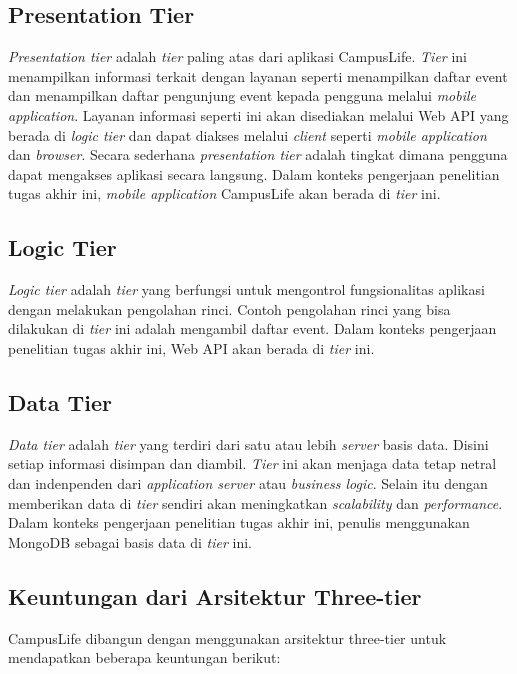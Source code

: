 \documentclass[a4paper, 12pt]{report}
\begin{document}
\subsection{Presentation Tier}
\onehalfspacing \textit{Presentation tier} adalah \textit{tier} paling atas dari aplikasi CampusLife. \textit{Tier} ini menampilkan informasi terkait dengan layanan seperti menampilkan daftar event dan menampilkan daftar pengunjung event kepada pengguna melalui \textit{mobile application}. Layanan informasi seperti ini akan disediakan melalui Web API yang berada di \textit{logic tier} dan dapat diakses melalui \textit{client} seperti \textit{mobile application} dan \textit{browser}. Secara sederhana \textit{presentation tier} adalah tingkat dimana pengguna dapat mengakses aplikasi secara langsung. Dalam konteks pengerjaan penelitian tugas akhir ini, \textit{mobile application} CampusLife akan berada di \textit{tier} ini\cite{multitier-architecture-wikipedia}.

\subsection{Logic Tier}
\onehalfspacing \textit{Logic tier} adalah \textit{tier} yang berfungsi untuk mengontrol fungsionalitas aplikasi dengan melakukan pengolahan rinci. Contoh pengolahan rinci yang bisa dilakukan di \textit{tier} ini adalah mengambil daftar event. Dalam konteks pengerjaan penelitian tugas akhir ini, Web API akan berada di \textit{tier} ini\cite{multitier-architecture-wikipedia}.

\subsection{Data Tier}
\onehalfspacing \textit{Data tier} adalah \textit{tier} yang terdiri dari satu atau lebih \textit{server} basis data. Disini setiap informasi disimpan dan diambil. \textit{Tier} ini akan menjaga data tetap netral dan indenpenden dari \textit{application server} atau \textit{business logic}. Selain itu dengan memberikan data di \textit{tier} sendiri akan meningkatkan \textit{scalability} dan \textit{performance}. Dalam konteks pengerjaan penelitian tugas akhir ini, penulis menggunakan MongoDB sebagai basis data di \textit{tier} ini\cite{multitier-architecture-wikipedia}.

\subsection{Keuntungan dari Arsitektur Three-tier}
\onehalfspacing CampusLife dibangun dengan menggunakan arsitektur three-tier untuk mendapatkan beberapa keuntungan berikut:
\end{document}
